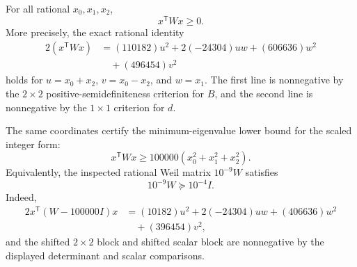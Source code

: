 \begin{theorem}
\label{thm:fibonacci-window-weil-matrix-psd}
For all rational $x_0,x_1,x_2$,
$$
x^{\mathsf T}Wx\geq 0.
$$
More precisely, the exact rational identity
$$
\begin{aligned}
2(x^{\mathsf T}Wx)
&=(110182)u^2+2(-24304)uw+(606636)w^2\\
&\quad +(496454)v^2
\end{aligned}
$$
holds for $u=x_0+x_2$, $v=x_0-x_2$, and $w=x_1$. The first line is nonnegative by the $2\times2$ positive-semidefiniteness criterion for $B$, and the second line is nonnegative by the $1\times1$ criterion for $d$.

The same coordinates certify the minimum-eigenvalue lower bound for the scaled integer form:
$$
x^{\mathsf T}Wx\geq 100000(x_0^2+x_1^2+x_2^2).
$$
Equivalently, the inspected rational Weil matrix $10^{-9}W$ satisfies
$$
10^{-9}W\succeq 10^{-4}I.
$$
Indeed,
$$
\begin{aligned}
2x^{\mathsf T}(W-100000I)x
&=(10182)u^2+2(-24304)uw+(406636)w^2\\
&\quad +(396454)v^2,
\end{aligned}
$$
and the shifted $2\times2$ block and shifted scalar block are nonnegative by the displayed determinant and scalar comparisons.
\end{theorem}
